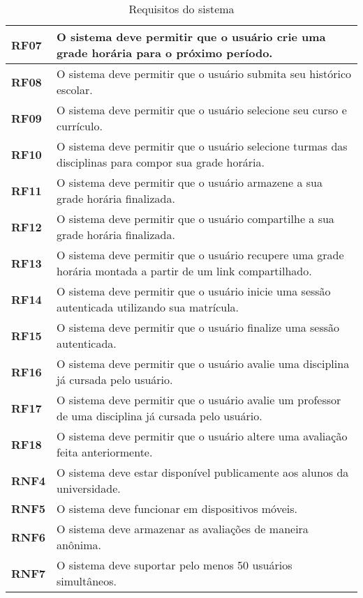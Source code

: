 \begin{table}[!ht]
    \begin{center}
        \begin{tabular}{ | m{} | p{} | }  
            \hline
            \textbf{RF07} & O sistema deve permitir que o usuário crie uma grade horária para o próximo período.\tabularnewline\hline
            \textbf{RF08} & O sistema deve permitir que o usuário submita seu histórico escolar.\tabularnewline\hline
            \textbf{RF09} & O sistema deve permitir que o usuário selecione seu curso e currículo.\tabularnewline\hline
            \textbf{RF10} & O sistema deve permitir que o usuário selecione turmas das disciplinas para compor sua grade horária.\tabularnewline\hline
            \textbf{RF11} & O sistema deve permitir que o usuário armazene a sua grade horária finalizada.\tabularnewline\hline
            \textbf{RF12} & O sistema deve permitir que o usuário compartilhe a sua grade horária finalizada. \tabularnewline\hline
            \textbf{RF13} & O sistema deve permitir que o usuário recupere uma grade horária montada a partir de um link compartilhado.\tabularnewline\hline
            

            \textbf{RF14} & O sistema deve permitir que o usuário inicie uma sessão autenticada utilizando sua matrícula.\tabularnewline\hline
            \textbf{RF15} & O sistema deve permitir que o usuário finalize uma sessão autenticada.\tabularnewline\hline
            \textbf{RF16} & O sistema deve permitir que o usuário avalie uma disciplina já cursada pelo usuário.\tabularnewline\hline
            \textbf{RF17} & O sistema deve permitir que o usuário avalie um professor de uma disciplina já cursada pelo usuário.\tabularnewline\hline
            \textbf{RF18} & O sistema deve permitir que o usuário altere uma avaliação feita anteriormente.\tabularnewline\hline


            \textbf{RNF4} & O sistema deve estar disponível publicamente aos alunos da universidade.\tabularnewline\hline
            \textbf{RNF5} & O sistema deve funcionar em dispositivos móveis.\tabularnewline\hline
            \textbf{RNF6} & O sistema deve armazenar as avaliações de maneira anônima.\tabularnewline\hline
            \textbf{RNF7} & O sistema deve suportar pelo menos 50 usuários simultâneos.\tabularnewline\hline
        
        \end{tabular}
    \end{center}
    \caption{Requisitos do sistema}
    
    \label{tab:req-sistema}
\end{table}

